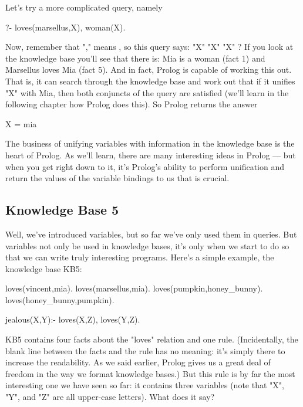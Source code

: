 Let's try a more complicated query, namely
\begin{LPNcodedisplay}
?- loves(marsellus,X), woman(X).
\end{LPNcodedisplay}
Now, remember that "," means , so this query says:
 "X"  "X"  "X" ?  If you look at the
knowledge base you'll see that there is: Mia is a woman (fact 1) and
Marsellus loves Mia (fact 5).  And in fact, Prolog is capable of
working this out. That is, it can search through the knowledge base
and work out that if it unifies "X" with Mia, then both conjuncts of
the query are satisfied (we'll learn in the following chapter how
Prolog does this).  So Prolog returns the answer
\begin{LPNcodedisplay}
X = mia
\end{LPNcodedisplay}



The business of unifying variables with information in the knowledge
base is the heart of Prolog.  As we'll learn, there are many
interesting ideas in Prolog --- but when you get right down to it,
it's Prolog's ability to perform unification and return the values of
the variable bindings to us that is crucial.



\subsection*{Knowledge Base 5}\label{SUBSEC.L1.KB5}


Well, we've introduced variables, but so far we've only used them in
queries. But variables not only  be used in knowledge
bases, it's only when we start to do so that we can write truly
interesting programs.  Here's a simple example, the knowledge base
KB5:

\begin{LPNcodedisplay}
loves(vincent,mia).
loves(marsellus,mia).
loves(pumpkin,honey_bunny).
loves(honey_bunny,pumpkin).

jealous(X,Y):- loves(X,Z), loves(Y,Z).
\end{LPNcodedisplay}


KB5 contains four facts about the "loves" relation and one rule.
(Incidentally, the blank line between the facts and the rule has no
meaning: it's simply there to increase the readability. As we said
earlier, Prolog gives us a great deal of freedom in the way we format
knowledge bases.)  But this rule is by far the most interesting one we
have seen so far: it contains three variables (note that "X", "Y", and
"Z" are all upper-case letters). What does it say?

